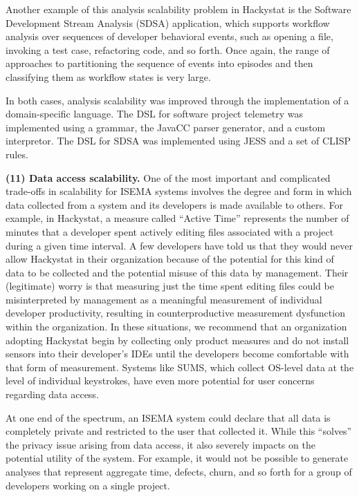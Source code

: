 \documentclass[10pt,twocolumn]{article}
\begin{document}
Another example of this analysis scalability problem in Hackystat is the
Software Development Stream Analysis (SDSA) application, which supports
workflow analysis over sequences of developer behavioral events, such as
opening a file, invoking a test case, refactoring code, and so forth. 
Once again, the range of approaches to partitioning the sequence of events into
episodes and then classifying them as workflow states is very large.  

In both cases, analysis scalability was improved through the implementation
of a domain-specific language.  The DSL for software project telemetry was
implemented using a grammar, the JavaCC parser generator, and a custom
interpretor.  The DSL for SDSA was implemented using JESS and a set of
CLISP rules. 

{\bf (11) Data access scalability.}  One of the most important and
complicated trade-offs in scalability for ISEMA systems involves the degree
and form in which data collected from a system and its developers is made
available to others.  For example, in Hackystat, a measure called ``Active
Time'' represents the number of minutes that a developer spent actively
editing files associated with a project during a given time interval.  A
few developers have told us that they would never allow Hackystat in their
organization because of the potential for this kind of data to be collected
and the potential misuse of this data by management. Their (legitimate)
worry is that measuring just the time spent editing files could be
misinterpreted by management as a meaningful measurement of individual
developer productivity, resulting in counterproductive measurement
dysfunction within the organization.  In these situations, we recommend
that an organization adopting Hackystat begin by collecting only product
measures and do not install sensors into their developer's IDEs until the
developers become comfortable with that form of measurement. Systems like
SUMS, which collect OS-level data at the level of individual keystrokes,
have even more potential for user concerns regarding data access.

At one end of the spectrum, an ISEMA system could declare that all data is
completely private and restricted to the user that collected it.  While
this ``solves'' the privacy issue arising from data access, it also
severely impacts on the potential utility of the system. For example, it
would not be possible to generate analyses that represent aggregate time,
defects, churn, and so forth for a group of developers working on a single
project.
\end{document}
